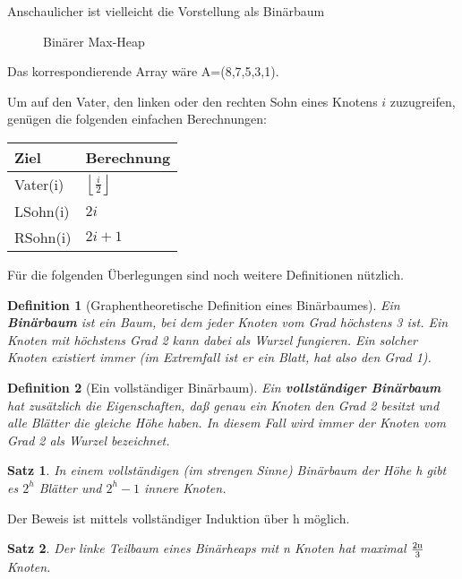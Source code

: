 \documentclass[ngerman,draft,parskip=half*,twoside]{scrreprt}
\theoremstyle{break}
\newtheorem{satz}{Satz}[chapter]
\newtheorem{definition}{Definition}[chapter]
\theoremstyle{nonumberbreak}
\begin{document}
Anschaulicher ist vielleicht die Vorstellung als Binärbaum
\begin{figure}[H]
	\centering
	\caption{Binärer Max-Heap}
	\label{101103a}
\end{figure}
Das korrespondierende Array wäre A=(8,7,5,3,1).

Um auf den Vater, den linken oder den rechten Sohn eines Knotens $i$ zuzugreifen, genügen die folgenden einfachen Berechnungen:

\begin{tabular}{l|l}
Ziel & Berechnung\\
\hline
Vater(i) & $\left\lfloor\frac{i}{2}\right\rfloor$\\
LSohn(i) & $2i$\\
RSohn(i) & $2i+1$\\
\end{tabular}

Für die folgenden Überlegungen sind noch weitere Definitionen nützlich.

\begin{definition}[Graphentheoretische Definition eines Binärbaumes]
Ein \textbf{Binärbaum} ist ein Baum, bei dem jeder Knoten vom Grad höchstens 3 ist. Ein Knoten mit
höchstens Grad 2 kann dabei als Wurzel fungieren. Ein solcher Knoten existiert immer (im Extremfall ist er ein Blatt, hat also den Grad
1). 
\end{definition}

\begin{definition}[Ein vollständiger Binärbaum]
Ein \textbf{vollständiger Binärbaum} hat zusätzlich die Eigenschaften, daß genau ein Knoten den Grad 2 besitzt und alle Blätter die
gleiche Höhe haben. In diesem Fall wird immer der Knoten vom Grad 2 als Wurzel bezeichnet.
\end{definition}

\begin{satz}
In einem vollständigen (im strengen Sinne) Binärbaum der Höhe h gibt es $2^{h}$ Blätter und $2^h-1$ innere Knoten.
\end{satz}
Der Beweis ist mittels vollständiger Induktion über h möglich.

\begin{satz}
Der linke Teilbaum eines Binärheaps mit n Knoten hat maximal $\frac{2\textup{n}}{3}$ Knoten.
\end{satz}
\end{document}
